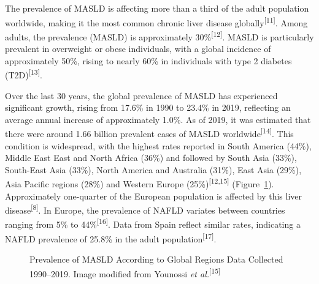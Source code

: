 \documentclass[
  11pt,
  letterpaper,
]{book}
\begin{document}
The prevalence of MASLD is affecting more than a third of the adult
population worldwide, making it the most common chronic liver disease
globally\textsuperscript{{[}11{]}}. Among adults, the prevalence (MASLD)
is approximately 30\%\textsuperscript{{[}12{]}}. MASLD is particularly
prevalent in overweight or obese individuals, with a global incidence of
approximately 50\%, rising to nearly 60\% in individuals with type 2
diabetes (T2D)\textsuperscript{{[}13{]}}.

Over the last 30 years, the global prevalence of MASLD has experienced
significant growth, rising from 17.6\% in 1990 to 23.4\% in 2019,
reflecting an average annual increase of approximately 1.0\%. As of
2019, it was estimated that there were around 1.66 billion prevalent
cases of MASLD worldwide\textsuperscript{{[}14{]}}. This condition is
widespread, with the highest rates reported in South America (44\%),
Middle East East and North Africa (36\%) and followed by South Asia
(33\%), South-East Asia (33\%), North America and Australia (31\%), East
Asia (29\%), Asia Paciﬁc regions (28\%) and Western Europe
(25\%)\textsuperscript{{[}12,15{]}}
(Figure~\ref{fig-prevalence_younossi2023global}). Approximately
one-quarter of the European population is affected by this liver
disease\textsuperscript{{[}8{]}}. In Europe, the prevalence of NAFLD
variates between countries ranging from 5\% to
44\%\textsuperscript{{[}16{]}}. Data from Spain reflect similar rates,
indicating a NAFLD prevalence of 25.8\% in the adult
population\textsuperscript{{[}17{]}}.

\begin{figure}[h]


\caption{\label{fig-prevalence_younossi2023global}Prevalence of MASLD
According to Global Regions Data Collected 1990--2019. Image modified
from Younossi \emph{et al.}\textsuperscript{{[}15{]}}}

\end{figure}%
\end{document}
